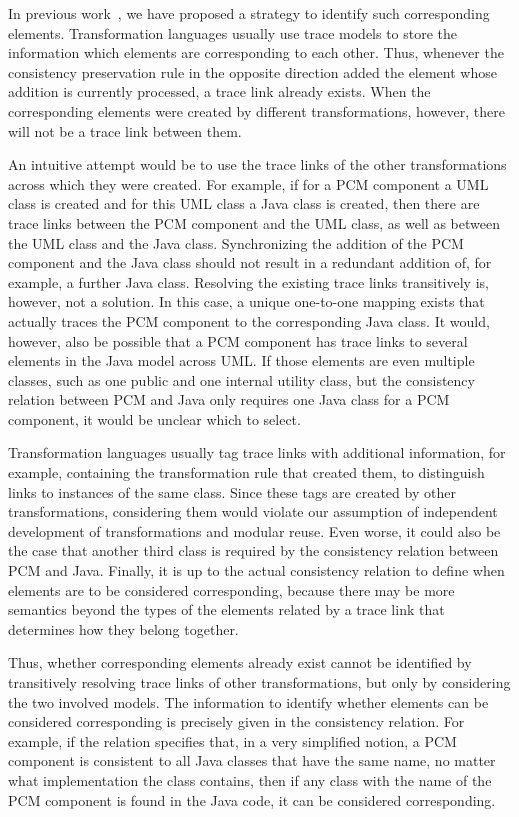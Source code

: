 In previous work~, we have proposed a strategy to identify such corresponding elements.
Transformation languages usually use trace models to store the information which elements are corresponding to each other.
Thus, whenever the consistency preservation rule in the opposite direction added the element whose addition is currently processed, a trace link already exists.
When the corresponding elements were created by different transformations, however, there will not be a trace link between them.

An intuitive attempt would be to use the trace links of the other transformations across which they were created.
For example, if for a \gls{PCM} component a \gls{UML} class is created and for this \gls{UML} class a Java class is created, then there are trace links between the \gls{PCM} component and the \gls{UML} class, as well as between the \gls{UML} class and the Java class.
Synchronizing the addition of the \gls{PCM} component and the Java class should not result in a redundant addition of, for example, a further Java class.
Resolving the existing trace links transitively is, however, not a solution.
In this case, a unique one-to-one mapping exists that actually traces the \gls{PCM} component to the corresponding Java class.
It would, however, also be possible that a \gls{PCM} component has trace links to several elements in the Java model across \gls{UML}.
If those elements are even multiple classes, such as one public and one internal utility class, but the consistency relation between \gls{PCM} and Java only requires one Java class for a \gls{PCM} component, it would be unclear which to select.

Transformation languages usually tag trace links with additional information, for example, containing the transformation rule that created them, to distinguish links to instances of the same class.
Since these tags are created by other transformations, considering them would violate our assumption of independent development of transformations and modular reuse.
Even worse, it could also be the case that another third class is required by the consistency relation between \gls{PCM} and Java.
Finally, it is up to the actual consistency relation to define when elements are to be considered corresponding, because there may be more semantics beyond the types of the elements related by a trace link that determines how they belong together.

Thus, whether corresponding elements already exist cannot be identified by transitively resolving trace links of other transformations, but only by considering the two involved models.
The information to identify whether elements can be considered corresponding is precisely given in the consistency relation.
For example, if the relation specifies that, in a very simplified notion, a \gls{PCM} component is consistent to all Java classes that have the same name, no matter what implementation the class contains, then if any class with the name of the \gls{PCM} component is found in the Java code, it can be considered corresponding.

